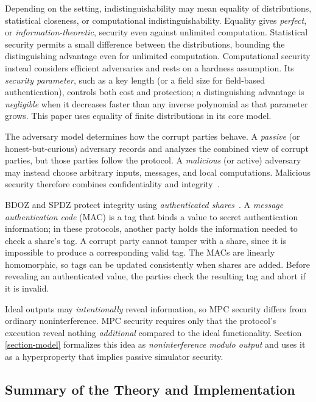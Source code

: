Depending on the setting, indistinguishability may mean equality of
distributions, statistical closeness, or computational
indistinguishability. Equality gives \emph{perfect}, or
\emph{information-theoretic}, security even against unlimited
computation. Statistical security permits a small difference between
the distributions, bounding the distinguishing advantage even for
unlimited computation. Computational security instead considers
efficient adversaries and rests on a hardness assumption. Its
\emph{security parameter}, such as a key length (or a field size for
field-based authentication), controls both cost and protection; a
distinguishing advantage is \emph{negligible} when it decreases faster
than any inverse polynomial as that parameter grows. This paper uses
equality of finite distributions in its core model.

The adversary model determines how the corrupt parties behave. A
\emph{passive} (or honest-but-curious) adversary records and analyzes
the combined view of corrupt parties, but those parties follow the
protocol. A \emph{malicious} (or active) adversary may instead choose
arbitrary inputs, messages, and local computations. Malicious security
therefore combines confidentiality and
integrity~\cite{evans2018pragmatic}.

BDOZ and SPDZ protect integrity using \emph{authenticated
  shares}~\cite{SPDZ1, SPDZ2, BDOZ, 10.1007/978-3-030-68869-1_3}. A
\emph{message authentication code} (MAC) is a tag that binds a value
to secret authentication information; in these protocols, another
party holds the information needed to check a share's tag. A corrupt
party cannot tamper with a share, since it is impossible to produce a
corresponding valid tag. The MACs are linearly homomorphic, so tags
can be updated consistently when shares are added. Before revealing an
authenticated value, the parties check the resulting tag and abort if
it is invalid.

Ideal outputs may \emph{intentionally} reveal information, so MPC
security differs from ordinary noninterference. MPC security requires
only that the protocol's execution reveal nothing \emph{additional}
compared to the ideal functionality. Section \ref{section-model}
formalizes this idea as \emph{noninterference modulo output} and uses
it as a hyperproperty that implies passive simulator
security.

\subsection{Summary of the Theory and Implementation}

